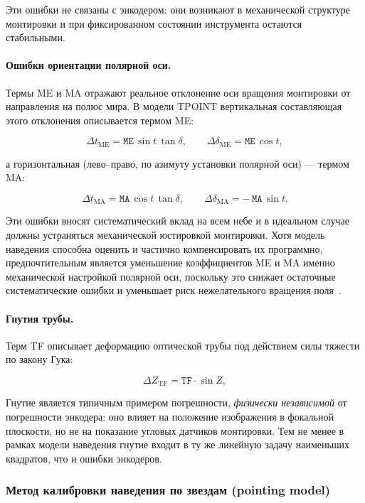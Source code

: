 Эти ошибки не связаны с энкодером: они возникают в механической структуре монтировки и при фиксированном состоянии инструмента остаются стабильными.
    
\paragraph{Ошибки ориентации полярной оси.} Термы ME и MA отражают реальное отклонение оси вращения монтировки от направления на полюс мира. В модели TPOINT вертикальная составляющая этого отклонения описывается термом ME:

$$
\Delta t_{\mathrm{ME}} = \mathtt{ME}\,\sin t \,\tan\delta,
\qquad
\Delta \delta_{\mathrm{ME}} = \mathtt{ME}\,\cos t ,
$$

а горизонтальная (лево--право, по азимуту установки полярной оси) --- термом MA:

$$
\Delta t_{\mathrm{MA}} = \mathtt{MA}\,\cos t \,\tan\delta,
\qquad
\Delta \delta_{\mathrm{MA}} = -\,\mathtt{MA}\,\sin t .
$$

Эти ошибки вносят систематический вклад на всем небе и в идеальном случае должны устраняться механической юстировкой монтировки. Хотя модель наведения способна оценить и частично компенсировать их программно, предпочтительным является уменьшение коэффициентов ME и MA именно механической настройкой полярной оси, поскольку это снижает остаточные систематические ошибки и уменьшает риск нежелательного вращения поля~\cite{TPoint_Wallace}.

\paragraph{Гнутия трубы.} Терм TF описывает деформацию оптической трубы под действием силы тяжести по закону Гука:
    
$$
\Delta Z_{\mathrm{TF}} = \mathtt{TF} \cdot \sin Z,
$$

Гнутие является типичным примером погрешности, \textit{физически независимой} от погрешности энкодера: оно влияет на положение изображения в фокальной плоскости, но не на показание угловых датчиков монтировки. Тем не менее в рамках модели наведения гнутие входит в ту же линейную задачу наименьших квадратов, что и ошибки энкодеров.

\subsubsection{Метод калибровки наведения по звездам (pointing model)}
\label{subsubsec:pointing_method}

